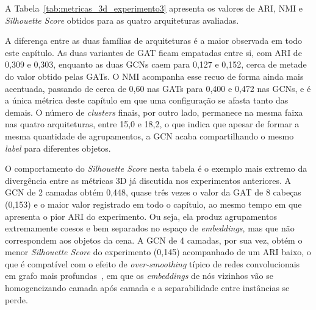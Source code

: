 A Tabela~\ref{tab:metricas_3d_experimento3} apresenta os valores de ARI, NMI e \textit{Silhouette Score} obtidos para as quatro arquiteturas avaliadas.

\begin{table}[h]
\centering
\caption{Métricas de clusterização 3D para cada arquitetura (média de 5 execuções)}
\label{tab:metricas_3d_experimento3}
\end{table}

A diferença entre as duas famílias de arquiteturas é a maior observada em todo este capítulo. As duas variantes de GAT ficam empatadas entre si, com ARI de 0,309 e 0,303, enquanto as duas GCNs caem para 0,127 e 0,152, cerca de metade do valor obtido pelas GATs. O NMI acompanha esse recuo de forma ainda mais acentuada, passando de cerca de 0,60 nas GATs para 0,400 e 0,472 nas GCNs, e é a única métrica deste capítulo em que uma configuração se afasta tanto das demais. O número de \textit{clusters} finais, por outro lado, permanece na mesma faixa nas quatro arquiteturas, entre 15,0 e 18,2, o que indica que apesar de formar a mesma quantidade de agrupamentos, a GCN acaba compartilhando o mesmo \textit{label} para diferentes objetos.

O comportamento do \textit{Silhouette Score} nesta tabela é o exemplo mais extremo da divergência entre as métricas 3D já discutida nos experimentos anteriores. A GCN de 2 camadas obtém 0,448, quase três vezes o valor da GAT de 8 cabeças (0,153) e o maior valor registrado em todo o capítulo, ao mesmo tempo em que apresenta o pior ARI do experimento. Ou seja, ela produz agrupamentos extremamente coesos e bem separados no espaço de \textit{embeddings}, mas que não correspondem aos objetos da cena. A GCN de 4 camadas, por sua vez, obtém o menor \textit{Silhouette Score} do experimento (0,145) acompanhado de um ARI baixo, o que é compatível com o efeito de \textit{over-smoothing} típico de redes convolucionais em grafo mais profundas~\cite{li2018deeper}, em que os \textit{embeddings} de nós vizinhos vão se homogeneizando camada após camada e a separabilidade entre instâncias se perde.

